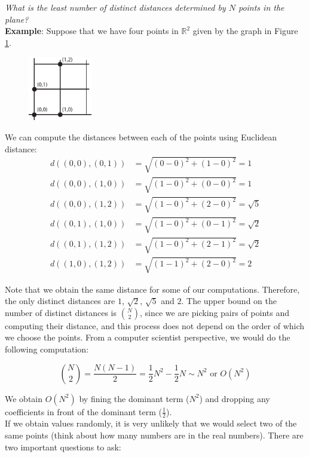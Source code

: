 \documentclass[12pt]{article}
\begin{document}
\textit{What is the least number of distinct distances determined by $N$ points in the plane?} \\

\noindent \textbf{Example}: Suppose that we have four points in $\mathbb{R}^2$ given by the graph in Figure \ref{erdos}. 
\begin{figure}[H]
\centering
\includegraphics[width=0.25\textwidth]{1ErdosExample.pdf}
\caption{}
\label{erdos}
\end{figure}

\noindent We can compute the distances between each of the points using Euclidean distance: \\
\begin{align*}
d((0,0),(0,1)) &= \sqrt{(0-0)^2+(1-0)^2} = 1 \\
d((0,0),(1,0)) &= \sqrt{(1-0)^2+(0-0)^2} = 1 \\
d((0,0),(1,2)) &= \sqrt{(1-0)^2+(2-0)^2} = \sqrt{5} \\
d((0,1),(1,0)) &= \sqrt{(1-0)^2+(0-1)^2} = \sqrt{2} \\
d((0,1),(1,2)) &= \sqrt{(1-0)^2+(2-1)^2} = \sqrt{2} \\
d((1,0),(1,2)) &= \sqrt{(1-1)^2+(2-0)^2} = 2 
\end{align*}

\noindent Note that we obtain the same distance for some of our computations. Therefore, the only distinct distances are $1$, $\sqrt{2}$, $\sqrt{5}$ and $2$. The upper bound on the number of distinct distances is $\binom{N}{2}$, since we are picking pairs of points and computing their distance, and this process does not depend on the order of which we choose the points. From a computer scientist perspective, we would do the following computation:

$$\binom{N}{2} = \frac{N(N-1)}{2}=\frac{1}{2}N^2 -\frac{1}{2}N \sim N^2 \text{ or } O(N^2)$$

\noindent We obtain $O(N^2)$ by fining the dominant term ($N^2$) and dropping any coefficients in front of the dominant term ($\frac{1}{2}$). \\

\noindent If we obtain values randomly, it is very unlikely that we would select two of the same points (think about how many numbers are in the real numbers). There are two important questions to ask: \\
\end{document}
